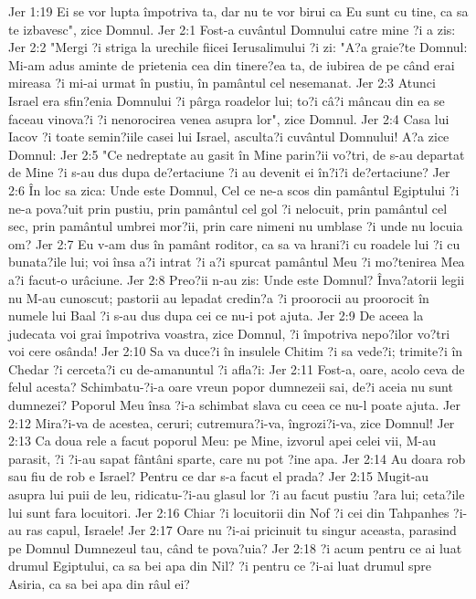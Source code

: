 Jer 1:19  Ei se vor lupta împotriva ta, dar nu te vor birui ca Eu sunt cu tine, ca sa te izbavesc", zice Domnul.
Jer 2:1  Fost-a cuvântul Domnului catre mine ?i a zis:
Jer 2:2  "Mergi ?i striga la urechile fiicei Ierusalimului ?i zi: "A?a graie?te Domnul: Mi-am adus aminte de prietenia cea din tinere?ea ta, de iubirea de pe când erai mireasa ?i mi-ai urmat în pustiu, în pamântul cel nesemanat.
Jer 2:3  Atunci Israel era sfin?enia Domnului ?i pârga roadelor lui; to?i câ?i mâncau din ea se faceau vinova?i ?i nenorocirea venea asupra lor", zice Domnul.
Jer 2:4  Casa lui Iacov ?i toate semin?iile casei lui Israel, asculta?i cuvântul Domnului! A?a zice Domnul:
Jer 2:5  "Ce nedreptate au gasit în Mine parin?ii vo?tri, de s-au departat de Mine ?i s-au dus dupa de?ertaciune ?i au devenit ei în?i?i de?ertaciune?
Jer 2:6  În loc sa zica: Unde este Domnul, Cel ce ne-a scos din pamântul Egiptului ?i ne-a pova?uit prin pustiu, prin pamântul cel gol ?i nelocuit, prin pamântul cel sec, prin pamântul umbrei mor?ii, prin care nimeni nu umblase ?i unde nu locuia om?
Jer 2:7  Eu v-am dus în pamânt roditor, ca sa va hrani?i cu roadele lui ?i cu bunata?ile lui; voi însa a?i intrat ?i a?i spurcat pamântul Meu ?i mo?tenirea Mea a?i facut-o urâciune.
Jer 2:8  Preo?ii n-au zis: Unde este Domnul? Înva?atorii legii nu M-au cunoscut; pastorii au lepadat credin?a ?i proorocii au proorocit în numele lui Baal ?i s-au dus dupa cei ce nu-i pot ajuta.
Jer 2:9  De aceea la judecata voi grai împotriva voastra, zice Domnul, ?i împotriva nepo?ilor vo?tri voi cere osânda!
Jer 2:10  Sa va duce?i în insulele Chitim ?i sa vede?i; trimite?i în Chedar ?i cerceta?i cu de-amanuntul ?i afla?i:
Jer 2:11  Fost-a, oare, acolo ceva de felul acesta? Schimbatu-?i-a oare vreun popor dumnezeii sai, de?i aceia nu sunt dumnezei? Poporul Meu însa ?i-a schimbat slava cu ceea ce nu-l poate ajuta.
Jer 2:12  Mira?i-va de acestea, ceruri; cutremura?i-va, îngrozi?i-va, zice Domnul!
Jer 2:13  Ca doua rele a facut poporul Meu: pe Mine, izvorul apei celei vii, M-au parasit, ?i ?i-au sapat fântâni sparte, care nu pot ?ine apa.
Jer 2:14  Au doara rob sau fiu de rob e Israel? Pentru ce dar s-a facut el prada?
Jer 2:15  Mugit-au asupra lui puii de leu, ridicatu-?i-au glasul lor ?i au facut pustiu ?ara lui; ceta?ile lui sunt fara locuitori.
Jer 2:16  Chiar ?i locuitorii din Nof ?i cei din Tahpanhes ?i-au ras capul, Israele!
Jer 2:17  Oare nu ?i-ai pricinuit tu singur aceasta, parasind pe Domnul Dumnezeul tau, când te pova?uia?
Jer 2:18  ?i acum pentru ce ai luat drumul Egiptului, ca sa bei apa din Nil? ?i pentru ce ?i-ai luat drumul spre Asiria, ca sa bei apa din râul ei?
